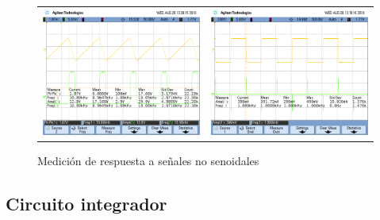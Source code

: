 \begin{figure}[H]
\begin{tabular}{c c}
		\includegraphics[scale=0.2]{../EJ4/Derivador/Mediciones/Osciloscopio/PCB_Compensado/osc_8.png} &
		\includegraphics[scale=0.2]{../EJ4/Derivador/Mediciones/Osciloscopio/PCB_Compensado/scope_23.png} 
	\end{tabular}
	\caption{Medici\'on de respuesta a se\~nales no senoidales}
	\label{fig:respuesta_derivador_compensado}
\end{figure}

	\subsection{Circuito integrador}

